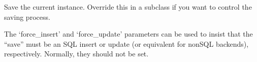 \documentclass[letterpaper,10pt,english]{sphinxmanual}
\begin{document}
\begin{fulllineitems}
\begin{fulllineitems}
\end{fulllineitems}


\begin{fulllineitems}
\label{\detokenize{source/api:api.models.ImageUpload.save}}
\pysigstartsignatures
{}
\pysigstopsignatures
\sphinxAtStartPar
Save the current instance. Override this in a subclass if you want to
control the saving process.

\sphinxAtStartPar
The ‘force\_insert’ and ‘force\_update’ parameters can be used to insist
that the “save” must be an SQL insert or update (or equivalent for
non\sphinxhyphen{}SQL backends), respectively. Normally, they should not be set.

\end{fulllineitems}


\end{fulllineitems}

\end{document}
